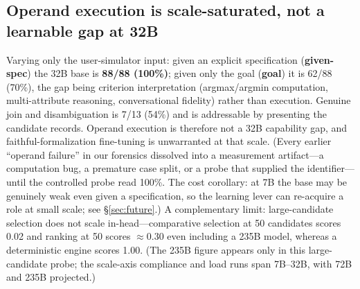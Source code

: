 \subsection{Operand execution is scale-saturated, not a learnable gap at 32B}\label{sec:results-operand}%
Varying only the user-simulator input: given an explicit specification (\textbf{given-spec}) the 32B base is \textbf{88/88 (100\%)}; given only the goal (\textbf{goal}) it is 62/88 (70\%), the gap being criterion interpretation (argmax/argmin computation, multi-attribute reasoning, conversational fidelity) rather than execution. Genuine join and disambiguation is 7/13 (54\%) and is addressable by presenting the candidate records. Operand execution is therefore not a 32B capability gap, and faithful-formalization fine-tuning is unwarranted at that scale. (Every earlier ``operand failure'' in our forensics dissolved into a measurement artifact---a computation bug, a premature case split, or a probe that supplied the identifier---until the controlled probe read 100\%. The cost corollary: at 7B the base may be genuinely weak even given a specification, so the learning lever can re-acquire a role at small scale; see \S\ref{sec:future}.) A complementary limit: large-candidate selection does not scale in-head---comparative selection at 50 candidates scores 0.02 and ranking at 50 scores $\approx0.30$ even including a 235B model, whereas a deterministic engine scores 1.00. (The 235B figure appears only in this large-candidate probe; the scale-axis compliance and load runs span 7B--32B, with 72B and 235B projected.)

